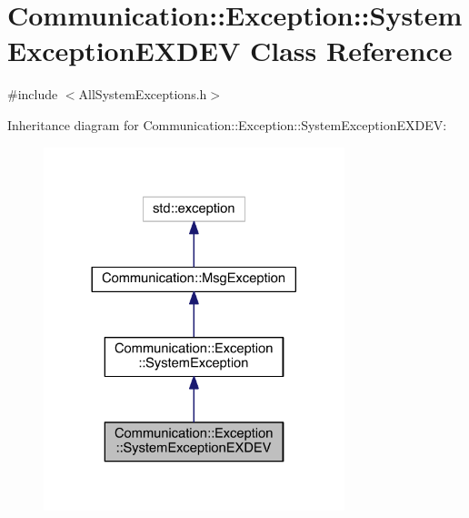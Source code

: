 \hypertarget{class_communication_1_1_exception_1_1_system_exception_e_x_d_e_v}{}\section{Communication\+:\+:Exception\+:\+:System\+Exception\+E\+X\+D\+E\+V Class Reference}
\label{class_communication_1_1_exception_1_1_system_exception_e_x_d_e_v}


{\ttfamily \#include $<$All\+System\+Exceptions.\+h$>$}



Inheritance diagram for Communication\+:\+:Exception\+:\+:System\+Exception\+E\+X\+D\+E\+V\+:\nopagebreak
\begin{figure}[H]
\begin{center}
\leavevmode
\includegraphics[width=248pt]{class_communication_1_1_exception_1_1_system_exception_e_x_d_e_v__inherit__graph}
\end{center}
\end{figure}


